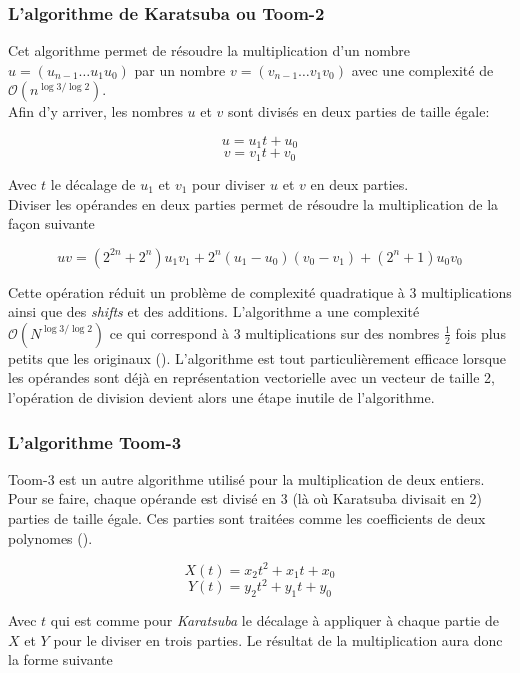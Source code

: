 \documentclass[letterpaper]{article}
\begin{document}
\subsubsection{L'algorithme de Karatsuba ou Toom-2}

Cet algorithme permet de résoudre la multiplication d'un nombre
$u = (u_{n-1} \dots u_1 u_0)$ par un nombre $v = (v_{n-1} \dots v_1 v_0)$
avec une complexité de $\mathcal{O}(n^{\log{3}/\log{2}})$.\\

Afin d'y arriver, les nombres $u$ et $v$ sont divisés en deux parties de taille
égale:

  $$u = u_1 t + u_0$$
  $$v = v_1 t + v_0$$

Avec $t$ le décalage de $u_1$ et $v_1$ pour diviser $u$ et $v$ en deux parties.\\

Diviser les opérandes en deux parties permet de résoudre la multiplication
de la façon suivante

  $$uv = (2^{2n} + 2^n) u_1 v_1 + 2^n (u_1 - u_0) (v_0 - v_1) + (2^n + 1) u_0 v_0$$

Cette opération réduit un problème de complexité quadratique à 3 multiplications
ainsi que des \emph{shifts} et des additions.
L'algorithme a une complexité $\mathcal{O}(N^{\log{3}/\log{2}})$ ce qui
correspond à $3$ multiplications sur des nombres $\frac{1}{2}$ fois plus petits
que les originaux (\cite{gmplibkaratsuba}).
L'algorithme est tout particulièrement efficace lorsque les opérandes sont déjà
en représentation vectorielle avec un vecteur de taille 2, l'opération de
division devient alors une étape inutile de l'algorithme.

\subsubsection{L'algorithme Toom-3}

Toom-3 est un autre algorithme utilisé pour la multiplication de deux
entiers. Pour se faire, chaque opérande est divisé en 3 (là où Karatsuba
divisait en 2) parties de taille égale. Ces parties sont traitées comme les
coefficients de deux polynomes (\cite{gmplib2014}).

    $$X(t) = x_2 t^2 + x_1 t + x_0$$
    $$Y(t) = y_2 t^2 + y_1 t + y_0$$

Avec $t$ qui est comme pour \emph{Karatsuba} le décalage à appliquer à chaque
partie de $X$ et $Y$ pour le diviser en trois parties.
Le résultat de la multiplication aura donc la forme suivante
\end{document}
